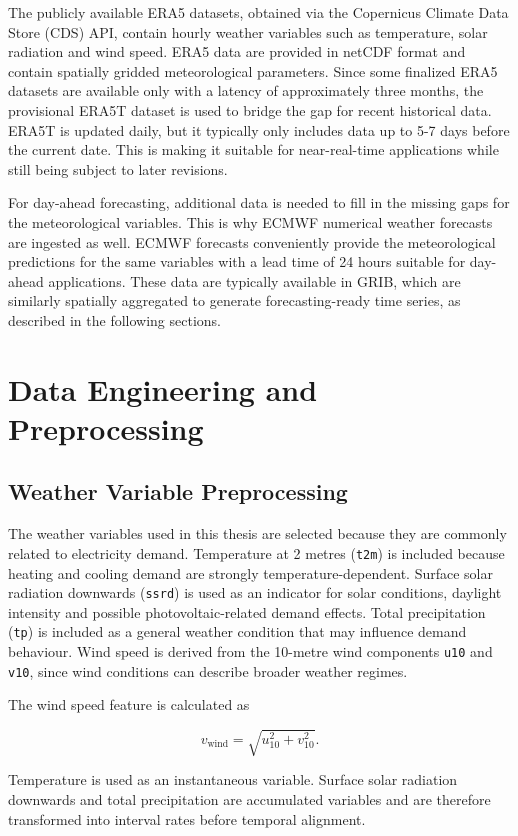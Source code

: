 \documentclass[Master,english,IEEE]{twbook}
\begin{document}
The publicly available ERA5 datasets, obtained via the Copernicus Climate Data Store (CDS) API, contain hourly weather variables such as temperature, solar radiation and wind speed. ERA5 data are provided in netCDF format and contain spatially gridded meteorological parameters. Since some finalized ERA5 datasets are available only with a latency of approximately three months, the provisional ERA5T dataset is used to bridge the gap for recent historical data. ERA5T is updated daily, but it typically only includes data up to 5-7 days before the current date. This is making it suitable for near-real-time applications while still being subject to later revisions.

For day-ahead forecasting, additional data is needed to fill in the missing gaps for the meteorological variables. This is why ECMWF numerical weather forecasts are ingested as well. ECMWF forecasts conveniently provide the meteorological predictions for the same variables with a lead time of 24 hours suitable for day-ahead applications. These data are typically available in GRIB, which are similarly spatially aggregated to generate forecasting-ready time series, as described in the following sections.

\section{Data Engineering and Preprocessing}
\subsection{Weather Variable Preprocessing}

The weather variables used in this thesis are selected because they are commonly related to electricity demand. Temperature at 2 metres (\texttt{t2m}) is included because heating and cooling demand are strongly temperature-dependent. Surface solar radiation downwards (\texttt{ssrd}) is used as an indicator for solar conditions, daylight intensity and possible photovoltaic-related demand effects. Total precipitation (\texttt{tp}) is included as a general weather condition that may influence demand behaviour. Wind speed is derived from the 10-metre wind components \texttt{u10} and \texttt{v10}, since wind conditions can describe broader weather regimes.

The wind speed feature is calculated as

\[
v_{\mathrm{wind}} = \sqrt{u_{10}^{2} + v_{10}^{2}}.
\]

Temperature is used as an instantaneous variable. Surface solar radiation downwards and total precipitation are accumulated variables and are therefore transformed into interval rates before temporal alignment.
\end{document}
